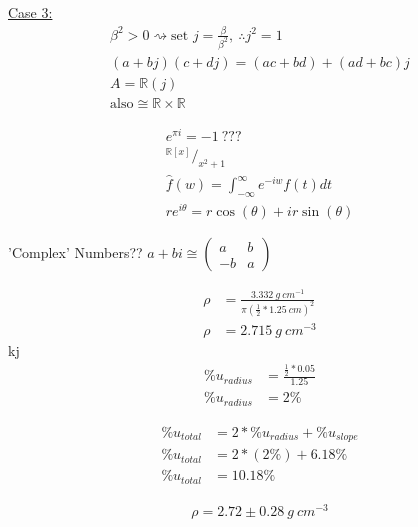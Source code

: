 \documentclass[11pt,a4paper]{article}
\newcommand{\reals}{\mathbb{R}}
\begin{document}
\underline{Case 3:} \\
\begin{align*}
\beta^2 > 0 \rightsquigarrow \text{set } j = \frac{\beta}{\beta^2}, \ \therefore j^2 = 1 \\
(a+bj)(c+dj) = (ac+bd)+(ad+bc)j \\
A = \reals(j) \\
\text{also} \cong \reals \times \reals
\end{align*}

\begin{align*}
e^{\pi i}=-1 \ ??? \\
^{\reals[x]}/_{x^2+1}\\ 
\hat{f} (w) = \int_{- \infty} ^{\infty} e^{-i w} f(t)dt \\
re^{i \theta} = r\cos(\theta) + ir\sin(\theta)
\end{align*}

'Complex' Numbers??
$
a+bi \cong \begin{pmatrix}
a & b \\
-b & a
\end{pmatrix}
$

\begin{align*}
\rho &= \frac{3.332\ g \ cm^{-1}}{\pi (\frac{1}{2}*1.25\ cm)^2} \\
\rho &= 2.715\ g \ cm^{-3}
\end{align*}
kj
\begin{align*}
\% u_{radius} &= \frac{\frac{1}{2}*0.05}{1.25}\\
\% u_{radius} &= 2\% 
\end{align*}

\begin{align*}
\%u_{total} &= 2*\% u_{radius} + \% u_{slope} \\
\%u_{total} &= 2*(2 \% ) + 6.18 \% \\
\%u_{total} &= 10.18 \%
\end{align*}

\begin{align*}
\rho = 2.72  \pm 0.28\  g\ cm^{-3}
\end{align*}
\end{document}
